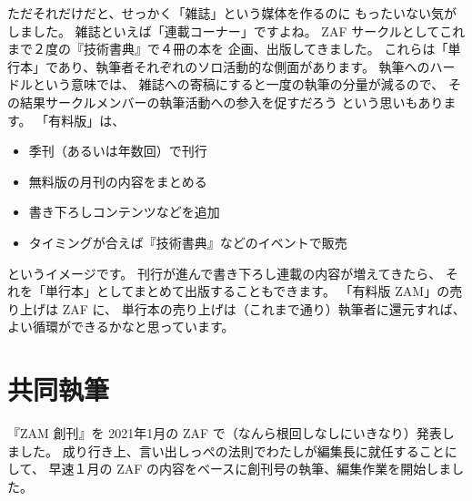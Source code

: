 \documentclass[dvipdfmx,autodetect-engine,10pt,b5paper,papersize,openany,dvipsnames]{jsbook}
\begin{document}
\begin{multicols}{2}
ただそれだけだと、せっかく「雑誌」という媒体を作るのに
もったいない気がしました。
雑誌といえば「連載コーナー」ですよね。
ZAF サークルとしてこれまで２度の『技術書典』で４冊の本を
企画、出版してきました。
これらは「単行本」であり、執筆者それぞれのソロ活動的な側面があります。
執筆へのハードルという意味では、
雑誌への寄稿にすると一度の執筆の分量が減るので、
その結果サークルメンバーの執筆活動への参入を促すだろう
という思いもあります。
「有料版」は、
\begin{itemize}
  \item 季刊（あるいは年数回）で刊行
  \item 無料版の月刊の内容をまとめる
  \item 書き下ろしコンテンツなどを追加
  \item タイミングが合えば『技術書典』などのイベントで販売
\end{itemize}
というイメージです。
刊行が進んで書き下ろし連載の内容が増えてきたら、
それを「単行本」としてまとめて出版することもできます。
「有料版 ZAM」の売り上げは ZAF に、
単行本の売り上げは（これまで通り）執筆者に還元すれば、
よい循環ができるかなと思っています。


\section{共同執筆}
『ZAM 創刊』を 2021年1月の ZAF で（なんら根回しなしにいきなり）発表しました。
成り行き上、言い出しっぺの法則でわたしが編集長に就任することにして、
早速１月の ZAF の内容をベースに創刊号の執筆、編集作業を開始しました。



\end{multicols}
\end{document}
